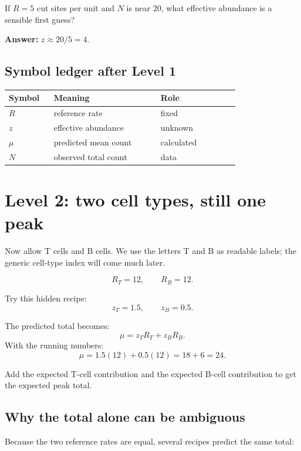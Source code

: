 \documentclass[11pt]{article}
\begin{document}
\begin{checkpoint}
If \(R=5\) cut sites per unit and \(N\) is near 20, what effective abundance is
a sensible first guess?

\textbf{Answer:} \(z\approx20/5=4\).
\end{checkpoint}

\subsection*{Symbol ledger after Level 1}

\begin{center}
\begin{tabular}{C{0.12\linewidth}L{0.38\linewidth}L{0.28\linewidth}}
\toprule
Symbol & Meaning & Role \\
\midrule
\(R\) & reference rate & fixed \\
\(z\) & effective abundance & unknown \\
\(\mu\) & predicted mean count & calculated \\
\(N\) & observed total count & data \\
\bottomrule
\end{tabular}
\end{center}

\section{Level 2: two cell types, still one peak}

Now allow T cells and B cells. We use the letters T and B as readable labels;
the generic cell-type index will come much later.

\[
R_T=12,\qquad R_B=12.
\]

Try this hidden recipe:
\[
z_T=1.5,\qquad z_B=0.5.
\]

The predicted total becomes:
\[
\boxed{\mu=z_TR_T+z_BR_B.}
\]
With the running numbers:
\[
\mu=1.5(12)+0.5(12)=18+6=24.
\]

\begin{translation}
Add the expected T-cell contribution and the expected B-cell contribution to get
the expected peak total.
\end{translation}

\subsection{Why the total alone can be ambiguous}

Because the two reference rates are equal, several recipes predict the same total:
\end{document}
